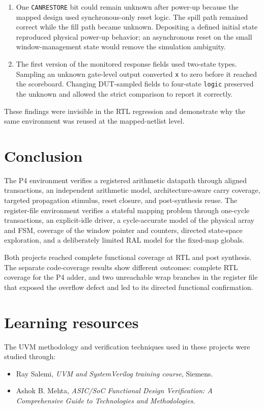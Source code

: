 \documentclass[11pt,a4paper]{article}
\newcommand{\code}[1]{\texttt{#1}}
\begin{document}
\begin{enumerate}
  \item One \code{CANRESTORE} bit could remain unknown after power-up because the mapped design used synchronous-only reset logic. The spill path remained correct while the fill path became unknown. Depositing a defined initial state reproduced physical power-up behavior; an asynchronous reset on the small window-management state would remove the simulation ambiguity.
  \item The first version of the monitored response fields used two-state types. Sampling an unknown gate-level output converted \code{x} to zero before it reached the scoreboard. Changing DUT-sampled fields to four-state \code{logic} preserved the unknown and allowed the strict comparison to report it correctly.
\end{enumerate}

These findings were invisible in the RTL regression and demonstrate why the same environment was reused at the mapped-netlist level.

\section{Conclusion}

The P4 environment verifies a registered arithmetic datapath through aligned transactions, an independent arithmetic model, architecture-aware carry coverage, targeted propagation stimulus, reset closure, and post-synthesis reuse. The register-file environment verifies a stateful mapping problem through one-cycle transactions, an explicit-idle driver, a cycle-accurate model of the physical array and FSM, coverage of the window pointer and counters, directed state-space exploration, and a deliberately limited RAL model for the fixed-map globals.

Both projects reached complete functional coverage at RTL and post synthesis. The separate code-coverage results show different outcomes: complete RTL coverage for the P4 adder, and two unreachable wrap branches in the register file that exposed the overflow defect and led to its directed functional confirmation.

\section{Learning resources}

The UVM methodology and verification techniques used in these projects were studied through:

\begin{itemize}
  \item Ray Salemi, \emph{UVM and SystemVerilog training course}, Siemens.
  \item Ashok B. Mehta, \emph{ASIC/SoC Functional Design Verification: A Comprehensive Guide to Technologies and Methodologies}.
\end{itemize}
\end{document}

